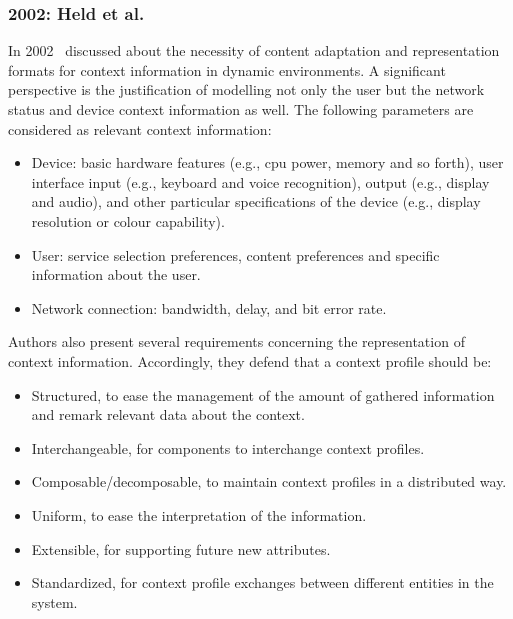 \subsubsection{2002: Held et al.}
\label{sec:held}

In 2002~\citet{held_modeling_2002} discussed about the necessity of content 
adaptation and representation formats for context information in dynamic 
environments. A significant perspective is the justification of modelling not 
only the user but the network status and device context information as well.
The following parameters are considered as relevant context information:

\begin{itemize}
  \item Device: basic hardware features (e.g., \acs{cpu} power, memory and so 
  forth), user interface input (e.g., keyboard and voice recognition), output 
  (e.g., display and audio), and other particular specifications of the 
  device (e.g., display resolution or colour capability).
  \item User: service selection preferences, content preferences and specific
  information about the user.
  \item Network connection: bandwidth, delay, and bit error rate. 
\end{itemize}

Authors also present several requirements concerning the representation of
context information. Accordingly, they defend that a context profile should be:

\begin{itemize}
  \item Structured, to ease the management of the amount of gathered information
  and remark relevant data about the context.
  \item Interchangeable, for components to interchange context profiles.
  \item Composable/decomposable, to maintain context profiles in a distributed way.
  \item Uniform, to ease the interpretation of the information.
  \item Extensible, for supporting future new attributes.
  \item Standardized, for context profile exchanges between different entities
  in the system.
\end{itemize}